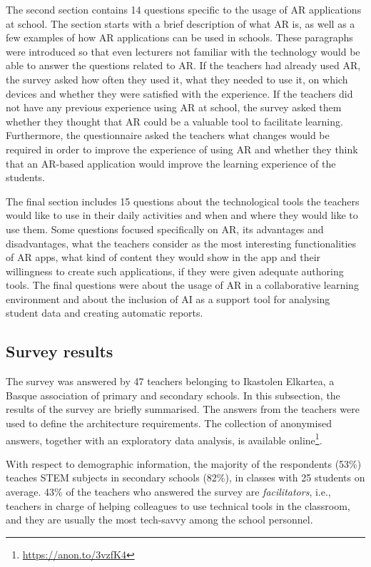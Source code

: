 The second section contains 14 questions specific to the usage of AR applications at school. The section starts with a brief description of what AR is, as well as a few examples of how AR applications can be used in schools. These paragraphs were introduced so that even lecturers not familiar with the technology would be able to answer the questions related to AR. If the teachers had already used AR, the survey asked how often they used it, what they needed to use it, on which devices and whether they were satisfied with the experience. If the teachers did not have any previous experience using AR at school, the survey asked them whether they thought that AR could be a valuable tool to facilitate learning.
Furthermore, the questionnaire asked the teachers what changes would be required in order to improve the experience of using AR and whether they think that an AR-based application would improve the  learning experience of the students.

The final section includes 15 questions about the technological tools the teachers would like to use in their daily activities and when and where they would like to use them. Some questions focused specifically on AR, its advantages and disadvantages, what the teachers consider as the most interesting functionalities of AR apps, what kind of content they would show in the app and their willingness to create such applications, if they were given adequate authoring tools. The final questions were about the usage of AR in a collaborative learning environment and about the inclusion of AI as a support tool for analysing student data and creating automatic reports.

\subsection{Survey results}\label{arch:req:surveyres}

The survey was answered by 47 teachers belonging to Ikastolen Elkartea, a Basque association of primary and secondary schools. In this subsection, the results of the survey are briefly summarised. The answers from the teachers were used to define the architecture requirements. The collection of anonymised answers, together with an exploratory data analysis, is available online\footnote{\url{https://anon.to/3vzfK4}}.

With respect to demographic information, the majority of the respondents (53\%) teaches STEM subjects in secondary schools (82\%), in classes with 25 students on average. 43\% of the teachers who answered the survey are \textit{facilitators}, i.e., teachers in charge of helping colleagues to use technical tools in the classroom, and they are usually the most tech-savvy  among the school personnel.

